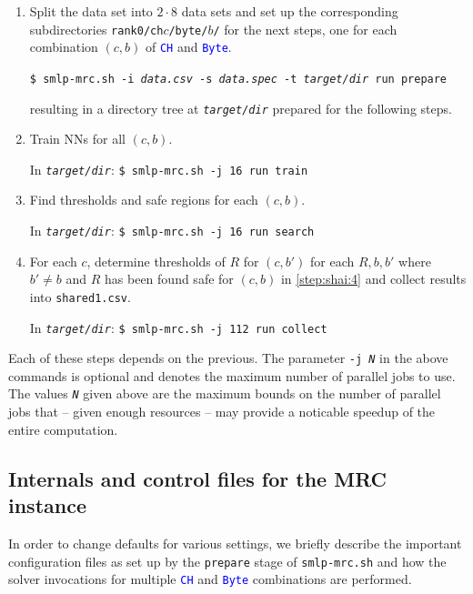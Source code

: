 \documentclass[a4paper,parskip=half]{article} %
\newcommand*\cmdstyle\texttt
\newcommand*\file\cmdstyle
\newcommand*\literalColor{blue}
\newcommand*\cmd[1]{\cmdstyle{\textcolor{red!85!black}{#1}}}
\newcommand*\cmdline[1]{\cmdstyle{\textcolor{green!70!black}\$ }\cmd{#1}}
\newcommand*\literal[1]{\textcolor{\literalColor}{\cmdstyle{#1}}}
\newcommand*\Solver{Symbolic Machine Learning Prover\xspace}
\newcommand*\progmrc{smlp-mrc.sh}
\begin{document}
\begin{enumerate}
\item\label{step:shai:2}
	Split the data set into $2\cdot8$ data sets and set up the corresponding
	subdirectories \file{rank0/ch$c$/byte/$b$/} for the next steps,
	one for each combination $(c,b)$ of \literal{CH} and \literal{Byte}.

	\cmdline{\progmrc{} -i \emph{data.csv} -s \emph{data.spec}
		-t \emph{target/dir}
		run prepare}

	resulting in a directory tree at \emph{\file{target/dir}} prepared for
	the following steps.
\item\label{step:shai:3}
	Train NNs for all $(c,b)$.

	In \file{\emph{target/dir}}: \cmdline{\progmrc{} -j 16 run train}
\item\label{step:shai:4}
	Find thresholds and safe regions for each $(c,b)$.

	In \file{\emph{target/dir}}: \cmdline{\progmrc{} -j 16 run search}
\item\label{step:shai:5}
	For each $c$, determine thresholds of $R$ for $(c,b')$
	for each $R,b,b'$ where $b'\neq b$ and $R$ has been found safe for
	$(c,b)$ in \cref{step:shai:4} and
	collect results into \file{shared1.csv}.

	In \file{\emph{target/dir}}: \cmdline{\progmrc{} -j 112 run collect}
\end{enumerate}
Each of these steps depends on the previous.
The parameter \cmdstyle{-j \emph N} in the above commands is optional and
denotes the maximum number of parallel jobs to use. The values \cmdstyle{\emph N}
given above are the maximum bounds on the number of parallel jobs that
-- given enough resources -- may provide a noticable speedup of the entire
computation.


\subsection{Internals and control files for the MRC instance}
In order to change defaults for various settings, we briefly describe the
important configuration files as set up by the \cmdstyle{prepare} stage of
\cmd{\progmrc} and how the solver invocations for multiple \literal{CH} and
\literal{Byte} combinations are performed.
\end{document}
